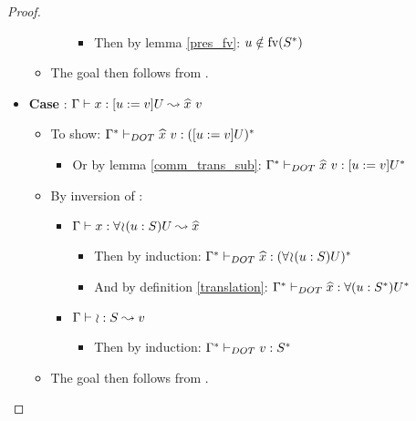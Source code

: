 \begin{proof}
\begin{itemize}
\begin{itemize}
\begin{itemize}
\begin{itemize}
                    \item Then by lemma \ref{pres_fv}: $u \notin \text{fv}(S^{*})$
                \end{itemize}
            \end{itemize}
            \item The goal then follows from .
        \end{itemize}
        \item \textbf{Case} :
            $\Gamma \vdash x: [u := v]U \leadsto \widehat{x}\ v$
        \begin{itemize}
            \item To show:
                $\TJT{\TRANS{\Gamma}}{\HAT{x}\ v}{\TRANS{(\SUB{u}{v}U)}}$
            \begin{itemize}
                \item Or by lemma \ref{comm_trans_sub}:
                    $\TJT{\TRANS{\Gamma}}{\HAT{x}\ v}{\SUB{u}{v}\TRANS{U}}$
            \end{itemize}
            \item By inversion of :
            \begin{itemize}
                \item $\Gamma \vdash x: \forall\!\wr\!(u:S)U \leadsto \widehat{x}$
                \begin{itemize}
                    \item Then by induction:
                        $\Gamma^{*} \vdash_{DOT} \widehat{x}: (\forall\!\wr\!(u:S)U)^{*}$
                    \item And by definition \ref{translation}:
                        $\Gamma^{*} \vdash_{DOT} \widehat{x}: \forall(u:S^{*})U^{*}$
                \end{itemize}
                \item $\Gamma \vdash \wr: S \leadsto v$
                \begin{itemize}
                    \item Then by induction:
                        $\Gamma^{*} \vdash_{DOT} v: S^{*}$
                \end{itemize}
            \end{itemize}
        \item The goal then follows from .
        \end{itemize}
    \end{itemize}
\end{proof}


